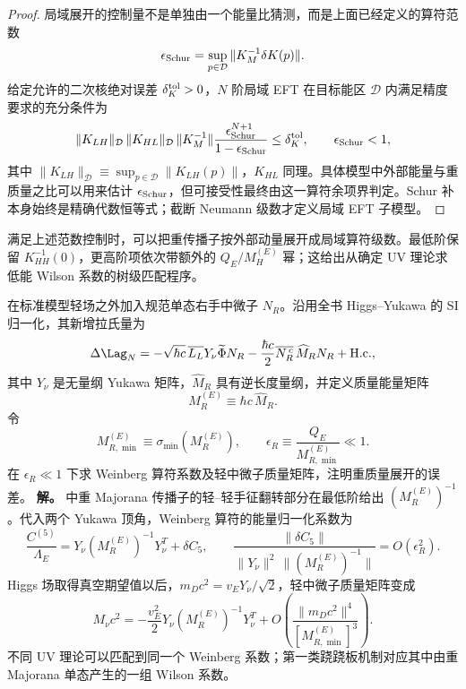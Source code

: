 \begin{proof}
局域展开的控制量不是单独由一个能量比猜测，而是上面已经定义的算符范数
\begin{equation*}
 \epsilon_{\rm Schur}=\sup_{p\in\mathcal D}\|K_M^{-1}\delta K(p)\|.
\end{equation*}
给定允许的二次核绝对误差 $\delta_K^{\rm tol}>0$，$N$ 阶局域 EFT 在目标能区 $\mathcal D$ 内满足精度要求的充分条件为
\begin{equation*}
 \|K_{LH}\|_{\mathcal D}\,\|K_{HL}\|_{\mathcal D}\,
 \|K_M^{-1}\|
 \frac{\epsilon_{\rm Schur}^{N+1}}{1-\epsilon_{\rm Schur}}
 \le \delta_K^{\rm tol},
 \qquad \epsilon_{\rm Schur}<1,
\end{equation*}
其中 $\|K_{LH}\|_{\mathcal D}\equiv\sup_{p\in\mathcal D}\|K_{LH}(p)\|$，$K_{HL}$ 同理。具体模型中外部能量与重质量之比可以用来估计 $\epsilon_{\rm Schur}$，但可接受性最终由这一算符余项界判定。Schur 补本身始终是精确代数恒等式；截断 Neumann 级数才定义局域 EFT 子模型。
\end{proof}

满足上述范数控制时，可以把重传播子按外部动量展开成局域算符级数。最低阶保留 $K_{HH}^{-1}(0)$，更高阶项依次带额外的 $Q_E/M_H^{(E)}$ 幂；这给出从确定 UV 理论求低能 Wilson 系数的树级匹配程序。

\begin{exbox}[重右手中微子与第一类跷跷板机制]
在标准模型轻场之外加入规范单态右手中微子 $N_R$。沿用全书 Higgs--Yukawa 的 SI 归一化，其新增拉氏量为
\begin{equation*}
 \Delta\Lag_N
 =-\sqrt{\hbar c}\,\overline{L_L}Y_\nu\widetilde\Phi N_R
 -\frac{\hbar c}{2}\overline{N_R^{\,c}}\,\widehat M_R N_R
 +\mathrm{H.c.},
\end{equation*}
其中 $Y_\nu$ 是无量纲 Yukawa 矩阵，$\widehat M_R$ 具有逆长度量纲，并定义质量能量矩阵
\begin{equation*}
 M_R^{(E)}\equiv\hbar c\,\widehat M_R.
\end{equation*}
令
\begin{equation*}
 M_{R,\min}^{(E)}\equiv\sigma_{\min}(M_R^{(E)}),
 \qquad
 \epsilon_R\equiv\frac{Q_E}{M_{R,\min}^{(E)}}\ll1.
\end{equation*}
在 $\epsilon_R\ll1$ 下求 Weinberg 算符系数及轻中微子质量矩阵，注明重质量展开的误差。
\textbf{解。}  中重 Majorana 传播子的轻--轻手征翻转部分在最低阶给出 $(M_R^{(E)})^{-1}$。代入两个 Yukawa 顶角，Weinberg 算符的能量归一化系数为
\begin{equation}
 {
 \frac{C^{(5)}}{\Lambda_E}
 =Y_\nu(M_R^{(E)})^{-1}Y_\nu^T+\delta C_5,
 \qquad
 \frac{\|\delta C_5\|}
 {\|Y_\nu\|^2\,\|(M_R^{(E)})^{-1}\|}
 =O(\epsilon_R^2).}
 \label{eq:typeI-weinberg-matching-dp86}
\end{equation}
Higgs 场取得真空期望值以后，$m_Dc^2=v_EY_\nu/\sqrt2$，轻中微子质量矩阵变成
\begin{equation}
 {
 M_\nu c^2
 =-\frac{v_E^2}{2}
 Y_\nu(M_R^{(E)})^{-1}Y_\nu^T
 +O\!\left(\frac{\|m_Dc^2\|^4}{[M_{R,\min}^{(E)}]^3}\right).}
 \label{eq:typeI-seesaw-mass-dp86}
\end{equation}
不同 UV 理论可以匹配到同一个 Weinberg 系数；第一类跷跷板机制对应其中由重 Majorana 单态产生的一组 Wilson 系数。
\end{exbox}
